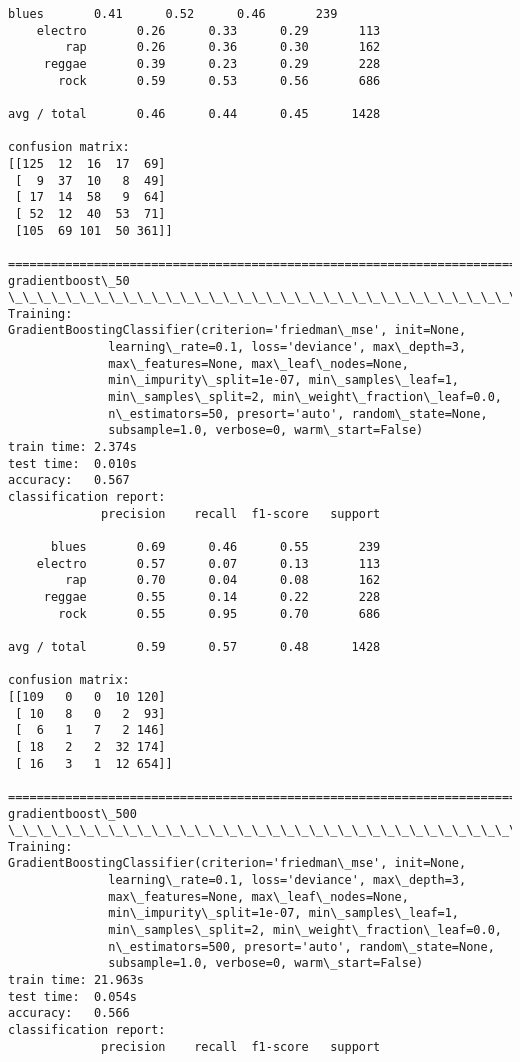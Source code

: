\documentclass[11pt]{article}
\begin{document}
\begin{Verbatim}[commandchars=\\\{\}]
      blues       0.41      0.52      0.46       239
    electro       0.26      0.33      0.29       113
        rap       0.26      0.36      0.30       162
     reggae       0.39      0.23      0.29       228
       rock       0.59      0.53      0.56       686

avg / total       0.46      0.44      0.45      1428

confusion matrix:
[[125  12  16  17  69]
 [  9  37  10   8  49]
 [ 17  14  58   9  64]
 [ 52  12  40  53  71]
 [105  69 101  50 361]]

================================================================================
gradientboost\_50
\_\_\_\_\_\_\_\_\_\_\_\_\_\_\_\_\_\_\_\_\_\_\_\_\_\_\_\_\_\_\_\_\_\_\_\_\_\_\_\_\_\_\_\_\_\_\_\_\_\_\_\_\_\_\_\_\_\_\_\_\_\_\_\_\_\_\_\_\_\_\_\_\_\_\_\_\_\_\_\_
Training: 
GradientBoostingClassifier(criterion='friedman\_mse', init=None,
              learning\_rate=0.1, loss='deviance', max\_depth=3,
              max\_features=None, max\_leaf\_nodes=None,
              min\_impurity\_split=1e-07, min\_samples\_leaf=1,
              min\_samples\_split=2, min\_weight\_fraction\_leaf=0.0,
              n\_estimators=50, presort='auto', random\_state=None,
              subsample=1.0, verbose=0, warm\_start=False)
train time: 2.374s
test time:  0.010s
accuracy:   0.567
classification report:
             precision    recall  f1-score   support

      blues       0.69      0.46      0.55       239
    electro       0.57      0.07      0.13       113
        rap       0.70      0.04      0.08       162
     reggae       0.55      0.14      0.22       228
       rock       0.55      0.95      0.70       686

avg / total       0.59      0.57      0.48      1428

confusion matrix:
[[109   0   0  10 120]
 [ 10   8   0   2  93]
 [  6   1   7   2 146]
 [ 18   2   2  32 174]
 [ 16   3   1  12 654]]

================================================================================
gradientboost\_500
\_\_\_\_\_\_\_\_\_\_\_\_\_\_\_\_\_\_\_\_\_\_\_\_\_\_\_\_\_\_\_\_\_\_\_\_\_\_\_\_\_\_\_\_\_\_\_\_\_\_\_\_\_\_\_\_\_\_\_\_\_\_\_\_\_\_\_\_\_\_\_\_\_\_\_\_\_\_\_\_
Training: 
GradientBoostingClassifier(criterion='friedman\_mse', init=None,
              learning\_rate=0.1, loss='deviance', max\_depth=3,
              max\_features=None, max\_leaf\_nodes=None,
              min\_impurity\_split=1e-07, min\_samples\_leaf=1,
              min\_samples\_split=2, min\_weight\_fraction\_leaf=0.0,
              n\_estimators=500, presort='auto', random\_state=None,
              subsample=1.0, verbose=0, warm\_start=False)
train time: 21.963s
test time:  0.054s
accuracy:   0.566
classification report:
             precision    recall  f1-score   support


\end{Verbatim}
\end{document}

